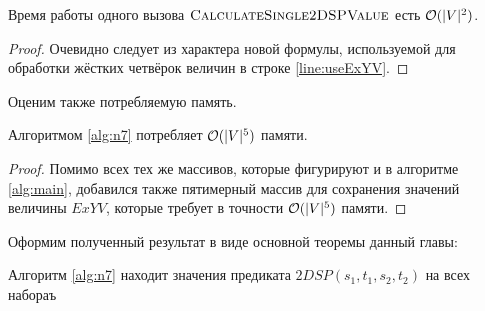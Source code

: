 \begin{proposition}
Время работы одного вызова $\textsc{CalculateSingle2DSPValue}$ есть $\mathcal{O}(|V|^2)$.
\end{proposition}
\begin{proof}
Очевидно следует из характера новой формулы, используемой для обработки жёстких четвёрок величин в строке \ref{line:useExYV}.
\end{proof}

Оценим также потребляемую память.

\begin{proposition}
Алгоритмом \ref{alg:n7} потребляет $\mathcal{O}(|V|^5)$ памяти.
\end{proposition}
\begin{proof}
Помимо всех тех же массивов, которые фигурируют и в алгоритме \ref{alg:main}, добавился также пятимерный массив для сохранения значений величины $ExYV$, которые требует в точности $\mathcal{O}(|V|^5)$ памяти.
\end{proof}

Оформим полученный результат в виде основной теоремы данный главы:
\begin{theorem}
Алгоритм \ref{alg:n7} находит значения предиката $2DSP(s_1, t_1, s_2, t_2)$ на всех набораъ 
\end{theorem}


